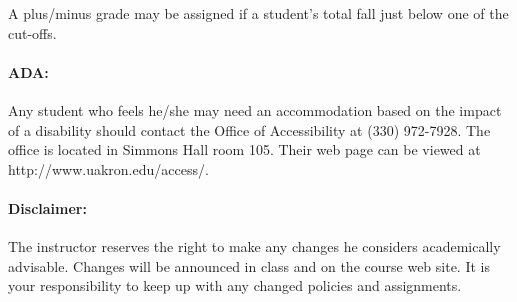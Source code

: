 A plus/minus grade may be assigned if a student's total  fall just below one of the cut-offs.
\vspace{-5mm}

\paragraph{ADA:}

Any student who feels he/she may need an accommodation based on the impact of a
disability should contact the Office of Accessibility at (330) 972-7928.
The office is located in Simmons Hall room 105. Their web page can be viewed at
http://www.uakron.edu/access/.



\paragraph{Disclaimer:}
The instructor reserves the right to make any changes he considers academically advisable. Changes will be announced in class and on the course web site. It is your responsibility to keep up with any changed policies and assignments.




